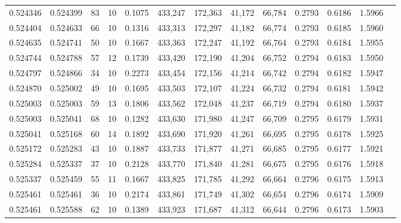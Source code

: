 \begin{tabular}{rrrrrrrrrrrrr}
0.524346 & 0.524399 &    83 &  10 &                                     0.1075 & 433,247 & 172,363 &  41,172 &  66,784 & 0.2793 & 0.6186 & 1.5966 \\
0.524404 & 0.524633 &    66 &  10 &                                     0.1316 & 433,313 & 172,297 &  41,182 &  66,774 & 0.2793 & 0.6185 & 1.5960 \\
0.524635 & 0.524741 &    50 &  10 &                                     0.1667 & 433,363 & 172,247 &  41,192 &  66,764 & 0.2793 & 0.6184 & 1.5955 \\
0.524744 & 0.524788 &    57 &  12 &                                     0.1739 & 433,420 & 172,190 &  41,204 &  66,752 & 0.2794 & 0.6183 & 1.5950 \\
0.524797 & 0.524866 &    34 &  10 &                                     0.2273 & 433,454 & 172,156 &  41,214 &  66,742 & 0.2794 & 0.6182 & 1.5947 \\
0.524870 & 0.525002 &    49 &  10 &                                     0.1695 & 433,503 & 172,107 &  41,224 &  66,732 & 0.2794 & 0.6181 & 1.5942 \\
0.525003 & 0.525003 &    59 &  13 &                                     0.1806 & 433,562 & 172,048 &  41,237 &  66,719 & 0.2794 & 0.6180 & 1.5937 \\
0.525003 & 0.525041 &    68 &  10 &                                     0.1282 & 433,630 & 171,980 &  41,247 &  66,709 & 0.2795 & 0.6179 & 1.5931 \\
0.525041 & 0.525168 &    60 &  14 &                                     0.1892 & 433,690 & 171,920 &  41,261 &  66,695 & 0.2795 & 0.6178 & 1.5925 \\
0.525172 & 0.525283 &    43 &  10 &                                     0.1887 & 433,733 & 171,877 &  41,271 &  66,685 & 0.2795 & 0.6177 & 1.5921 \\
0.525284 & 0.525337 &    37 &  10 &                                     0.2128 & 433,770 & 171,840 &  41,281 &  66,675 & 0.2795 & 0.6176 & 1.5918 \\
0.525337 & 0.525459 &    55 &  11 &                                     0.1667 & 433,825 & 171,785 &  41,292 &  66,664 & 0.2796 & 0.6175 & 1.5913 \\
0.525461 & 0.525461 &    36 &  10 &                                     0.2174 & 433,861 & 171,749 &  41,302 &  66,654 & 0.2796 & 0.6174 & 1.5909 \\
0.525461 & 0.525588 &    62 &  10 &                                     0.1389 & 433,923 & 171,687 &  41,312 &  66,644 & 0.2796 & 0.6173 & 1.5903 \\

\end{tabular}
